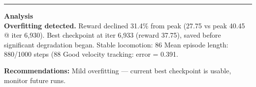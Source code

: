 \documentclass[a4paper,10pt]{article}
\begin{document}
\vspace{2pt}
\hrule
\vspace{2pt}

\footnotesize
\textbf{Analysis} \\[1pt]
\textbf{Overfitting detected.} Reward declined 31.4\% from peak (27.75 vs peak 40.45 @ iter 6,930).
Best checkpoint at iter 6,933 (reward 37.75), saved before significant degradation began.
Stable locomotion: 86%
Mean episode length: 880/1000 steps (88%
Good velocity tracking: error = 0.391.

\textbf{Recommendations:}
Mild overfitting --- current best checkpoint is usable, monitor future runs.
\end{document}
